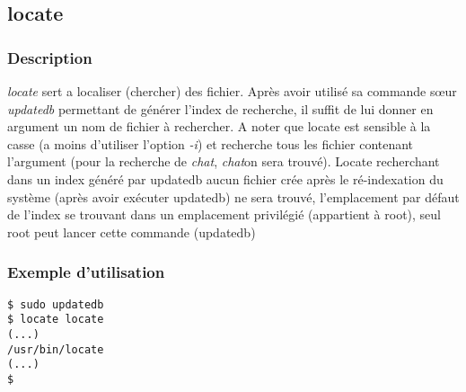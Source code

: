 \subsection*{locate}
\subsubsection*{Description}
\emph{locate} sert a localiser (chercher) des fichier. Après avoir utilisé sa commande sœur \emph{updatedb} permettant de générer l'index de recherche, il suffit de lui donner en argument un nom de fichier à rechercher.
A noter que locate est sensible à la casse (a moins d'utiliser l'option \emph{-i}) et recherche tous les fichier contenant l'argument (pour la recherche de \emph{chat}, \emph{chat}on sera trouvé).
Locate recherchant dans un index généré par updatedb aucun fichier crée après le ré-indexation du système (après avoir exécuter updatedb) ne sera trouvé, l'emplacement par défaut de l'index se trouvant dans un emplacement privilégié (appartient à root), seul root peut lancer cette commande (updatedb)

\subsubsection*{Exemple d'utilisation}

\begin{lstlisting}
$ sudo updatedb
$ locate locate
(...)
/usr/bin/locate
(...)
$
\end{lstlisting}
